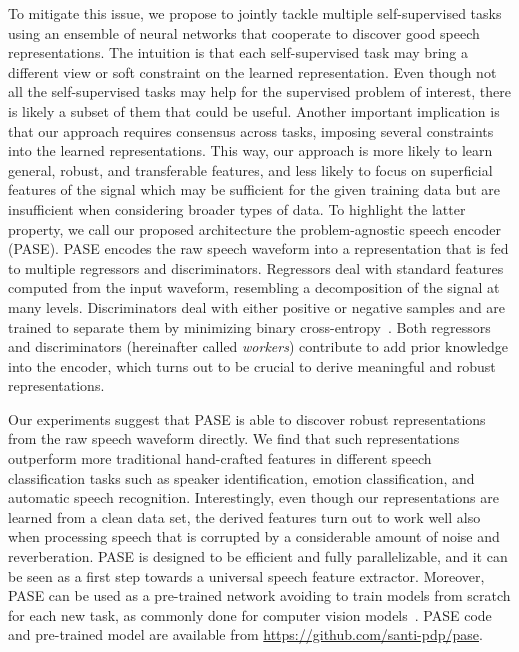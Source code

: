 \documentclass[a4paper]{article}
\begin{document}
To mitigate this issue, we propose to jointly tackle multiple self-supervised tasks using an ensemble of neural networks that cooperate to discover good speech representations. The intuition is that each self-supervised task may bring a different view or soft constraint on the learned representation. Even though not all the self-supervised tasks may help for the supervised problem of interest, there is likely a subset of them that could be useful. Another important implication is that our approach requires consensus across tasks, imposing several constraints into the learned representations. 
This way, our approach is more likely to learn general, robust, and transferable features, and less likely to focus on superficial features of the signal which may be sufficient for the given training data but are insufficient when considering broader types of data. To highlight the latter property, we call our proposed architecture the problem-agnostic speech encoder (PASE). PASE encodes the raw speech waveform into a representation that is fed to multiple regressors and discriminators. Regressors deal with standard features computed from the input waveform, resembling a decomposition of the signal at many levels. Discriminators deal with either positive or negative samples and are trained to separate them by minimizing binary cross-entropy~\cite{ravanelli2018learning}. 
Both regressors and discriminators (hereinafter called \textit{workers}) contribute to add prior knowledge into the encoder, which turns out to be crucial to derive meaningful and robust representations.

Our experiments suggest that PASE is able to discover robust representations from the raw speech waveform directly. We find that such representations outperform more traditional hand-crafted features in different speech classification tasks such as speaker identification, emotion classification, and automatic speech recognition. Interestingly, even though our representations are learned from a clean data set, the derived features turn out to work well also when processing speech that is corrupted by a considerable amount of noise and reverberation. PASE is designed to be efficient and fully parallelizable, and it can be seen as a first step towards a universal speech feature extractor. Moreover, PASE can be used as a pre-trained network avoiding to train models from scratch for each new task, as commonly done for computer vision models~\cite{vgg,inception}. PASE code and pre-trained model are available from \url{https://github.com/santi-pdp/pase}.
\end{document}
